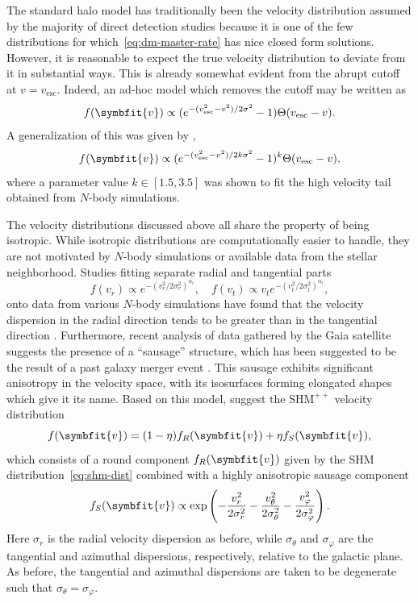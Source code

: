 \documentclass[b5paper, 10pt, twoside]{book}
\renewcommand{\vec}[1]{\symbfit{#1}}
\begin{document}
The standard halo model has traditionally been the velocity distribution assumed by the majority of direct detection studies because it is one of the few distributions for which~\eqref{eq:dm-master-rate} has nice closed form solutions. However, it is reasonable to expect the true velocity distribution to deviate from it in substantial ways. This is already somewhat evident from the abrupt cutoff at $v=v_\text{esc}$. Indeed, an ad-hoc model which removes the cutoff may be written as
\begin{equation}
    f(\vec{v})\propto(e^{-(v_\text{esc}^2-v^2)/2\sigma^2}-1)\Theta(v_\text{esc}-v).
\end{equation}
A generalization of this was given by \textcite{LisantiEtAl2011},
\begin{equation}
    f(\vec{v})\propto(e^{-(v_\text{esc}^2-v^2)/2k\sigma^2}-1)^k\Theta(v_\text{esc}-v),
\end{equation}
where a parameter value $k\in[1.5,3.5]$ was shown to fit the high velocity tail obtained from $N$-body simulations.

The velocity distributions discussed above all share the property of being isotropic. While isotropic distributions are computationally easier to handle, they are not motivated by $N$-body simulations or available data from the stellar neighborhood. Studies fitting separate radial and tangential parts
\begin{equation}
    f(v_r)\propto e^{-(v_r^2/2\sigma_r^2)^{\alpha_r}},\quad f(v_t)\propto v_te^{-(v_t^2/2\sigma_t^2)^{\alpha_t}},
\end{equation}
onto data from various $N$-body simulations have found that the velocity dispersion in the radial direction tends to be greater than in the tangential direction \parencites{FairbairnSchwetz2009, KuhlenEtAl2010}. Furthermore, recent analysis of data gathered by the Gaia satellite suggests the presence of a ``sausage'' structure, which has been suggested to be the result of a past galaxy merger event \parencites{BelokurovEtAl2018, KruijssenEtAl2018, HelmiEtAl2018}. This sausage exhibits significant anisotropy  in the velocity space, with its isosurfaces forming elongated shapes which give it its name. Based on this model, \textcite{EvansOHareMcCabe2019} suggest the $\text{SHM}^{++}$ velocity distribution
\begin{equation}
    f(\vec{v})=(1-\eta)f_R(\vec{v})+\eta f_S(\vec{v}),
\end{equation}
which consists of a round component $f_R(\vec{v})$ given by the SHM distribution~\eqref{eq:shm-dist} combined with a highly anisotropic sausage component
\begin{equation}
    f_S(\vec{v})\propto\exp\left(-\frac{v_r^2}{2\sigma_r^2}-\frac{v_\theta^2}{2\sigma_\theta^2}-\frac{v_\varphi^2}{2\sigma_\varphi^2}\right).
\end{equation}
Here $\sigma_r$ is the radial velocity dispersion as before, while $\sigma_\theta$ and $\sigma_\varphi$ are the tangential and azimuthal dispersions, respectively, relative to the galactic plane. As before, the tangential and azimuthal dispersions are taken to be degenerate such that $\sigma_\theta=\sigma_\varphi$.
\end{document}
